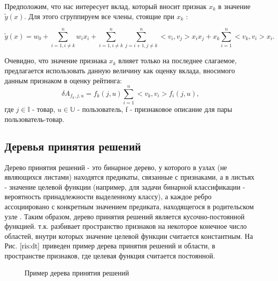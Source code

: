 \documentclass[12pt,a4paper]{report}
\begin{document}
Предположим, что нас интересует вклад, который вносит признак $x_k$ в значение $\tilde{y}(x)$. Для этого сгруппируем все члены, стоящие при $x_k$ :

\begin{equation*}
\tilde{y}(x) = w_0 + \sum_{i=1, i \neq k}^{n}w_ix_i + \sum_{i=1, i \neq k}^{n}\sum_{j=i+1, j \neq k}^{n}<v_i, v_j>x_ix_j + x_k \sum_{i = 1}^{n}<v_k, v_i>x_i.
\end{equation*}

Очевидно, что значение признака $x_k$ влияет только на последнее слагаемое, предлагается использовать данную величину как оценку вклада, вносимого данным признаком в оценку рейтинга:
\begin{equation*}
\delta A_{f_k, j, u} = f_k(j, u) \sum_{i = 1}^{n}<v_k, v_i>f_i(j, u),
\end{equation*}
где $j \in \mathbb{I}$ - товар, $u \in \mathbb{U}$ - пользователь, f - признаковое описание для пары пользователь-товар.


\subsection{Деревья принятия решений}
Дерево принятия решений - это бинарное дерево, у которого в узлах (не являющихся листами) находятся предикаты, связанные с признаками, а в листьях - значение целевой функции (например, для задачи бинарной классификации - вероятность принадлежности выделенному классу), а каждое ребро ассоциировано с конкретным значением предиката, находящегося в родительском узле \cite{Dt}.
Таким образом, дерево принятия решений является кусочно-постоянной функцией. т.к. разбивает пространство признаков на некоторое конечное число областей, внутри которых значение целевой функции считается константным. На Рис. $\ref{ris:dt}$ приведен пример дерева принятия решений и области, в пространстве признаков, где целевая функция считается постоянной.

\begin{figure}[H]
\center{\texttt{[image: dt]}}
\caption{Пример дерева принятия решений}
\label{ris:dt}
\end{figure}
\end{document}
